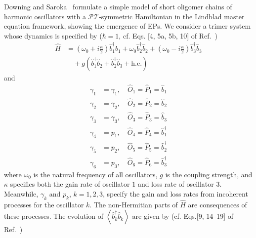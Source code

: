 \documentclass[onecolumn, 12pt, sort&compress]{elsarticle}
\newcounter{bla}
\newcommand{\expval}[1]{\left\langle{#1}\right\rangle}
\newcommand{\bop}{\hat{b}}
\newcommand{\bdag}{\bop^\dagger}
\begin{document}
Downing and Saroka~\cite{Downing2021} formulate a simple model of short oligomer chains of harmonic oscillators with a $\mathcal{P}\mathcal{T}$-symmetric Hamiltonian in the Lindblad master equation framework, showing the emergence of EPs. We consider a trimer system whose dynamics is specified by ($\hbar=1$, cf. Eqs. [4, 5a, 5b, 10] of Ref.~\cite{Downing2021})
\begin{equation}
\begin{split}
    \hat{H} &= \left(\omega_0+i\frac{\kappa}{2}\right)\bdag_1\bop_1 + \omega_0\bdag_2\bop_2 + \left(\omega_0-i\frac{\kappa}{2}\right)\bdag_3\bop_3
    \\
    &\quad + g\left(\bdag_1\bop_2+\bdag_2\bop_3+\mathrm{h.c.}\right)
\end{split}
\end{equation}
and
\begin{subequations}
\begin{align}
    \gamma_1&=\gamma_1,\quad \hat{O}_1=\hat{P}_1=\bop_1
    \\
    \gamma_2&=\gamma_2,\quad \hat{O}_2=\hat{P}_2=\bop_2
    \\
    \gamma_3&=\gamma_3,\quad \hat{O}_3=\hat{P}_3=\bop_3
    \\
    \gamma_4&=p_1,\quad \hat{O}_4=\hat{P}_4=\bdag_1
    \\
    \gamma_5&=p_2,\quad \hat{O}_5=\hat{P}_5=\bdag_2
    \\
    \gamma_6&=p_3,\quad \hat{O}_6=\hat{P}_6=\bdag_3
\end{align}
\end{subequations}
where $\omega_0$ is the natural frequency of all oscillators, $g$ is the coupling strength, and $\kappa$ specifies both the gain rate of oscillator $1$ and loss rate of oscillator $3$. Meanwhile, $\gamma_k$ and $p_k$, $k=1,2,3$, specify the gain and loss rates from incoherent processes for the oscillator $k$. The non-Hermitian parts of $\hat{H}$ are consequences of these processes. The evolution of $\expval{\bdag_k\bop_k}$ are given by (cf. Eqs.[9, 14--19] of Ref.~\cite{Downing2021})
\end{document}
